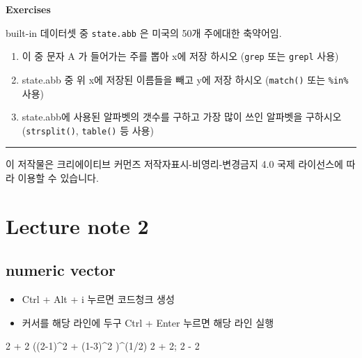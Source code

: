 \documentclass[
]{book}
\newenvironment{Shaded}{\begin{snugshade}}{\end{snugshade}}
\newcommand{\DecValTok}[1]{\textcolor[rgb]{0.00,0.00,0.81}{#1}}
\newcommand{\NormalTok}[1]{#1}
\newcommand{\SpecialCharTok}[1]{\textcolor[rgb]{0.00,0.00,0.00}{#1}}
\providecommand{\tightlist}{%
  \setlength{\itemsep}{0pt}\setlength{\parskip}{0pt}}
\begin{document}
\textbf{Exercises}

built-in 데이터셋 중 \texttt{state.abb} 은 미국의 50개 주에대한 축약어임.

\begin{enumerate}
\def\labelenumi{\arabic{enumi})}
\item
  이 중 문자 A 가 들어가는 주를 뽑아 x에 저장 하시오 (\texttt{grep} 또는 \texttt{grepl} 사용)
\item
  state.abb 중 위 x에 저장된 이름들을 빼고 y에 저장 하시오 (\texttt{match()} 또는 \texttt{\%in\%}사용)
\item
  state.abb에 사용된 알파벳의 갯수를 구하고 가장 많이 쓰인 알파벳을 구하시오 (\texttt{strsplit()}, \texttt{table()} 등 사용)
\end{enumerate}

\begin{center}\rule{0.5\linewidth}{0.5pt}\end{center}

이 저작물은 크리에이티브 커먼즈 저작자표시-비영리-변경금지 4.0 국제 라이선스에 따라 이용할 수 있습니다.

\hypertarget{lecture-note-2}{%
\chapter{Lecture note 2}\label{lecture-note-2}}

\hypertarget{numeric-vector}{%
\section{numeric vector}\label{numeric-vector}}

\begin{itemize}
\tightlist
\item
  Ctrl + Alt + i 누르면 코드청크 생성
\item
  커서를 해당 라인에 두구 Ctrl + Enter 누르면 해당 라인 실행
\end{itemize}

\begin{Shaded}
\begin{Highlighting}[]
\DecValTok{2} \SpecialCharTok{+} \DecValTok{2}
\NormalTok{((}\DecValTok{2{-}1}\NormalTok{)}\SpecialCharTok{\^{}}\DecValTok{2} \SpecialCharTok{+}\NormalTok{ (}\DecValTok{1{-}3}\NormalTok{)}\SpecialCharTok{\^{}}\DecValTok{2}\NormalTok{ )}\SpecialCharTok{\^{}}\NormalTok{(}\DecValTok{1}\SpecialCharTok{/}\DecValTok{2}\NormalTok{)}
\DecValTok{2} \SpecialCharTok{+} \DecValTok{2}\NormalTok{; }\DecValTok{2} \SpecialCharTok{{-}} \DecValTok{2}
\end{Highlighting}
\end{Shaded}
\end{document}
